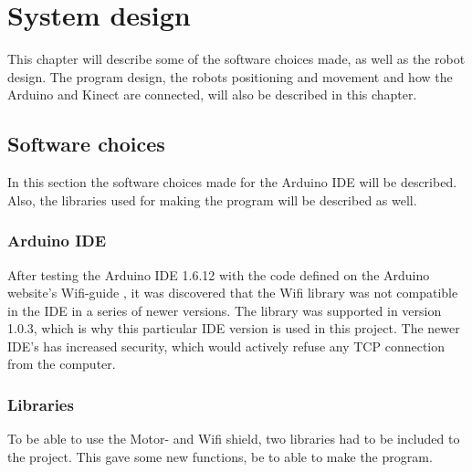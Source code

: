 \chapter{System design}
\label{chap:System design}
This chapter will describe some of the software choices made, as well as the robot design. The program design, the robots positioning and movement and how the Arduino and Kinect are connected, will also be described in this chapter. 

\section{Software choices}
\label{sec:Software choices}

In this section the software choices made for the Arduino IDE will be described. Also, the libraries used for making the program will be described as well. 

\subsection{Arduino IDE}
\label{sec:Arduino IDE}
After testing the Arduino IDE 1.6.12 with the code defined on the Arduino website's Wifi-guide \citep{wg}, it was discovered that the Wifi library was not compatible in the IDE in a series of newer versions. The library was supported in version 1.0.3, which is why this particular IDE version is used in this project. The newer IDE's has increased security, which would actively refuse any TCP connection from the computer.

\subsection{Libraries}
\label{sec:Libraries}
To be able to use the Motor- and Wifi shield, two libraries had to be included to the project. This gave some new functions, be to able to make the program. 

